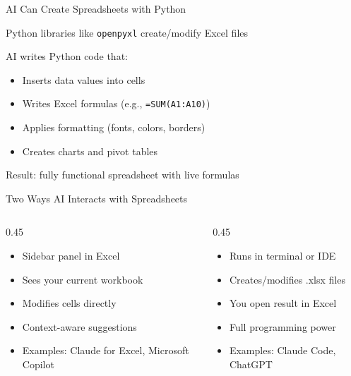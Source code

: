 \documentclass[aspectratio=169]{beamer}
\begin{document}
\begin{frame}{AI Can Create Spreadsheets with Python}
\begin{baritemize}
  \item Python libraries like \texttt{openpyxl} create/modify Excel files
  \item AI writes Python code that:
  \begin{itemize}
    \item Inserts data values into cells
    \item Writes Excel formulas (e.g., \texttt{=SUM(A1:A10)})
    \item Applies formatting (fonts, colors, borders)
    \item Creates charts and pivot tables
  \end{itemize}
  \item Result: fully functional spreadsheet with \alert{live formulas}
\end{baritemize}
\end{frame}



\begin{frame}{Two Ways AI Interacts with Spreadsheets}
\begin{columns}[T]
  \begin{column}{0.45\textwidth}
\begin{shadedbox}[title=\textbf{Inside Excel (Add-ins)}]
\begin{itemize}\small
  \item Sidebar panel in Excel
  \item Sees your current workbook
  \item Modifies cells directly
  \item Context-aware suggestions
  \item Examples: Claude for Excel, Microsoft Copilot
\end{itemize}
\end{shadedbox}
\end{column}
\begin{column}{0.45\textwidth}
\begin{shadedbox}[title=\textbf{Outside Excel (Python)}]
\begin{itemize}\small
  \item Runs in terminal or IDE
  \item Creates/modifies .xlsx files
  \item You open result in Excel
  \item Full programming power
  \item Examples: Claude Code, ChatGPT
\end{itemize}
\end{shadedbox}
\end{column}
\end{columns}
\end{frame}
\end{document}
